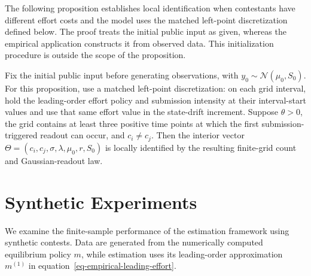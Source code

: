 \documentclass[mnsc]{informs3}
\begin{document}
{\color{blue}The following proposition establishes local identification when contestants have different effort costs and the model uses the matched left-point discretization defined below. The proof treats the initial public input as given, whereas the empirical application constructs it from observed data. This initialization procedure is outside the scope of the proposition.}

\begin{proposition}\label{prop-local-identification}
{Fix the initial public input before generating observations, with $y_0\sim\mathcal N(\mu_0,S_0)$. For this proposition, use a matched left-point discretization: on each grid interval, hold the leading-order effort policy and submission intensity at their interval-start values and use that same effort value in the state-drift increment. Suppose $\theta>0$, {\color{blue}the grid contains at least three positive time points at which the first submission-triggered readout can occur}, and $c_i\ne c_j$. Then the interior vector $\Theta=(c_i,c_j,\sigma,\lambda,\mu_0,r,S_0)$ is {\color{blue}locally identified} by the resulting finite-grid count and Gaussian-readout law.}
\end{proposition}


\section{Synthetic Experiments}\label{sect-synthetic}

{We examine the finite-sample performance of the estimation framework using synthetic contests. Data are generated from the numerically computed equilibrium policy $m$, while estimation uses its leading-order approximation $m^{(1)}$ in equation~\eqref{eq-empirical-leading-effort}.}
\end{document}
